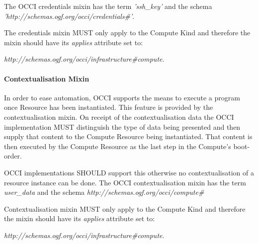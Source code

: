 \documentclass[10pt,a4paper]{article}
\begin{document}
The OCCI credentials mixin has the term \textit{'ssh\_key'} and the schema \textit{'http://schemas.ogf.org/occi/credentials\#'}.

The credentials mixin MUST only apply to the Compute Kind and therefore
the mixin should have its  \textit{applies} attribute set to:

\textit{http://schemas.ogf.org/occi/infrastructure\#compute}.



\paragraph{Contextualisation Mixin}

In order to ease automation, OCCI supports the means to execute a
program once Resource has been instantiated. This feature is
provided by the contextualisation mixin. On receipt of the
contextualisation data the OCCI implementation MUST distinguish
the type of data being presented and then supply that content to the
Compute Resource being instantiated. That content is then executed
by the Compute Resource as the last step in the Compute's boot-order.

OCCI implementations SHOULD support this otherwise no
contextualisation of a resource instance can be done.
The OCCI contextualisation mixin has the term \textit{user\_data}
and the schema \textit{http://schemas.ogf.org/occi/compute\#}

Contextualisation mixin MUST only apply to the Compute Kind and therefore
the mixin should have its  \textit{applies} attribute set to:

\textit{http://schemas.ogf.org/occi/infrastructure\#compute}.

\end{document}
